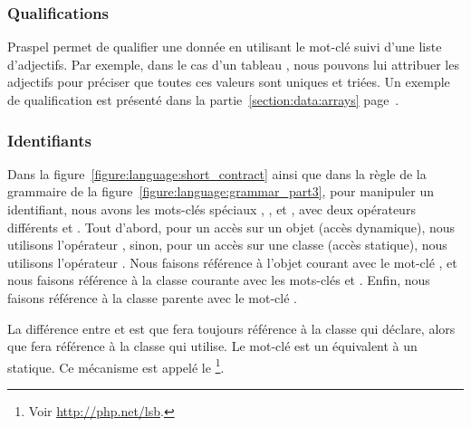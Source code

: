 \subsubsection{Qualifications}

Praspel permet de qualifier une donnée en utilisant le mot-clé  suivi
d'une liste d'adjectifs. Par exemple, dans le cas d'un tableau , nous
pouvons lui attribuer les adjectifs  pour préciser que
toutes ces valeurs sont uniques et triées. Un exemple de qualification est
présenté dans la partie~\ref{section:data:arrays}
page~\pageref{section:data:arrays}.

\subsubsection{Identifiants}

Dans la figure~\ref{figure:language:short_contract} ainsi que dans la règle
 de la grammaire de la
figure~\ref{figure:language:grammar_part3}, pour manipuler un identifiant, nous
avons les mots-clés spéciaux , ,  et
, avec deux opérateurs différents \code{->} et \code{::}. Tout
d'abord, pour un accès sur un objet (accès dynamique), nous utilisons
l'opérateur \code{->}, sinon, pour un accès sur une classe (accès statique),
nous utilisons l'opérateur \code{::}. Nous faisons référence à l'objet courant
avec le mot-clé , et nous faisons référence à la classe courante avec
les mots-clés  et . Enfin, nous faisons référence à la
classe parente avec le mot-clé .

La différence entre  et  est que  fera
toujours référence à la classe qui déclare, alors que  fera
référence à la classe qui utilise. Le mot-clé  est un équivalent à
un  statique. Ce mécanisme est appelé le \footnote{Voir \url{http://php.net/lsb}.}.

